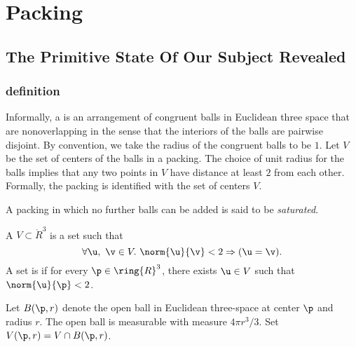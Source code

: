 
\chapter{Packing}


\section{The Primitive State Of Our Subject Revealed}
\subsection{definition}



Informally, a  is an arrangement of congruent
balls in Euclidean three space that are nonoverlapping in the sense
that the interiors of the balls are pairwise disjoint.  By convention,
we take the radius of the congruent balls to be $1$.
Let $ V$ be the set of centers of the balls in a
packing. The choice of unit radius for the
balls implies that any two points in $ V$ have distance at
least $2$ from each other. 
 Formally, the packing is identified
with the set of centers $V$.
%

%
A packing in which no further balls can be added is said to be {\it
saturated}.

\begin{definition} 
A  $ V\subset \ring{R}^3$ is a set such that
\begin{displaymath}
\forall  \u,~\v\in  V.~  \norm{ \u}{\v} < 2 \Rightarrow ( \u=\v).
\end{displaymath} 
A set is  if for every $\p\in\ring{R}^3$, there
exists $ \u\in V$ such that $\norm{ \u}{\p}< 2$.
\end{definition}
%
%



Let $B(\p,r)$ denote the open ball in
Euclidean three-space at center $\p$ and radius $r$.  The open ball
is measurable with measure $4\pi r^3/3$.
 Set $ V(\p,r) = V \cap
B(\p,r)$. %
%
%

